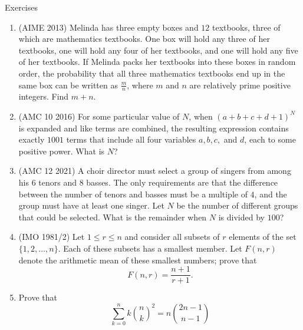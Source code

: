 \begin{xcb}{Exercises}
\begin{enumerate}
\item (AIME 2013)  Melinda has three empty boxes and $12$ textbooks, three of which are mathematics textbooks. One box will hold any three of her textbooks, one will hold any four of her textbooks, and one will hold any five of her textbooks. If Melinda packs her textbooks into these boxes in random order, the probability that all three mathematics textbooks end up in the same box can be written as $\frac{m}{n}$, where $m$ and $n$ are relatively prime positive integers. Find $m+n$.
\begin{hint}
\end{hint}
\item (AMC 10 2016)  For some particular value of $N$, when $(a + b + c + d + 1)^N$ is expanded and like terms are combined, the resulting expression contains exactly $1001$ terms that include all four variables $a, b, c,$ and $d$, each to some positive power. What is $N$?
\item (AMC 12 2021)  A choir director must select a group of singers from among his $6$ tenors and $8$ basses. The only requirements are that the difference between the number of tenors and basses must be a multiple of $4$, and the group must have at least one singer. Let $N$ be the number of different groups that could be selected. What is the remainder when $N$ is divided by $100$?
\begin{hint}
\end{hint}
\item (IMO 1981/2)  Let $\displaystyle 1 \le r \le n$ and consider all subsets of $\displaystyle r$ elements of the set $\{ 1, 2, \ldots , n \}$. Each of these subsets has a smallest member. Let $\displaystyle F(n,r)$ denote the arithmetic mean of these smallest numbers; prove that\\
\[F(n,r) = \frac{n+1}{r+1}.\]
\begin{hint}
\end{hint}
\item {} Prove that \[\sum_{k=0}^n k{\binom{n}{k}}^2=n\binom{2n-1}{n-1}\]
\end{enumerate}
\end{xcb}